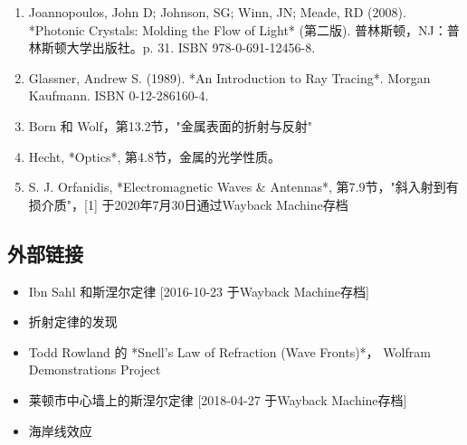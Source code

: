\begin{enumerate}
\item Joannopoulos, John D; Johnson, SG; Winn, JN; Meade, RD (2008). *Photonic Crystals: Molding the Flow of Light* (第二版). 普林斯顿，NJ：普林斯顿大学出版社。p. 31. ISBN 978-0-691-12456-8.  
\item Glassner, Andrew S. (1989). *An Introduction to Ray Tracing*. Morgan Kaufmann. ISBN 0-12-286160-4.  
\item Born 和 Wolf，第13.2节，"金属表面的折射与反射"  
\item Hecht, *Optics*, 第4.8节，金属的光学性质。  
\item S. J. Orfanidis, *Electromagnetic Waves & Antennas*, 第7.9节，"斜入射到有损介质"，[1] 于2020年7月30日通过Wayback Machine存档
\end{enumerate}
\subsection{外部链接}  
\begin{itemize}
\item Ibn Sahl 和斯涅尔定律 [2016-10-23 于Wayback Machine存档]  
\item 折射定律的发现  
\item Todd Rowland 的 *Snell's Law of Refraction (Wave Fronts)*， Wolfram Demonstrations Project  
\item 莱顿市中心墙上的斯涅尔定律 [2018-04-27 于Wayback Machine存档]  
\item 海岸线效应
\end{itemize}